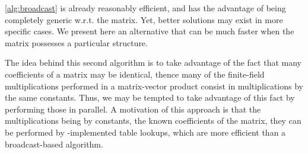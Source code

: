 \autoref{alg:broadcast} is already reasonably efficient, and has the
advantage of being completely generic w.r.t. the matrix. Yet, better solutions may exist in more specific cases.
We present here an alternative that can be much faster when the matrix possesses a particular structure.

The idea behind this second algorithm is to take advantage of the fact that many coefficients of a matrix may be identical, thence many of the finite-field multiplications performed in
a matrix-vector product consist in multiplications by the same constants. Thus, we may be tempted
to take advantage of this fact by performing those in parallel.
A motivation of this approach is that the multiplications being by constants, \ie
the known coefficients of the matrix, they can be
performed by \pshufb-implemented table lookups, which are more efficient than
a broadcast-based algorithm.

